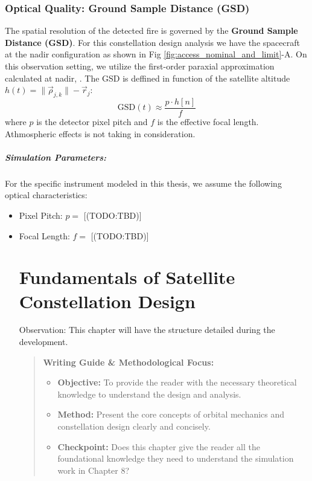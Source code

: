 \begin{table}[ht]
{\subsection{Optical Quality: Ground Sample Distance (GSD)}
\label{optical-quality}
The spatial resolution of the detected fire is governed by the \textbf{Ground Sample Distance (GSD)}. For this constellation design analysis we have the spacecraft at the nadir configuration as shown in Fig \ref{fig:access_nominal_and_limit}-A. On this observation setting, we utilize the first-order paraxial approximation calculated at nadir, . The GSD is deffined in function of the satellite altitude $h(t) = \|  \vec{\rho}_{j,k}  \| - \vec{r}_j$:
\begin{equation}
    \text{GSD}(t) \approx \frac{p \cdot h[n]}{f}
\end{equation}
where $p$ is the detector pixel pitch and $f$ is the effective focal length. Athmospheric effects is not taking in consideration. 

\paragraph{Simulation Parameters:}
For the specific instrument modeled in this thesis, we assume the following optical characteristics:
\begin{itemize}
    \item Pixel Pitch: $p = $ [(TODO:TBD)]
    \item Focal Length: $f = $ [(TODO:TBD)]

    \chapter{Fundamentals of Satellite Constellation
Design}\label{chapter-7-fundamentals-of-satellite-constellation-design}

Observation: This chapter will have the structure detailed during the
development.

\begin{quote}
\textbf{Writing Guide \& Methodological Focus:}

\begin{itemize}
\item
  \textbf{Objective:} To provide the reader with the necessary
  theoretical knowledge to understand the design and analysis.
\item
  \textbf{Method:} Present the core concepts of orbital mechanics and
  constellation design clearly and concisely.
\item
  \textbf{Checkpoint:} Does this chapter give the reader all the
  foundational knowledge they need to understand the simulation work in
  Chapter 8?
\end{itemize}
\end{quote}


\end{itemize}}
\end{table}
